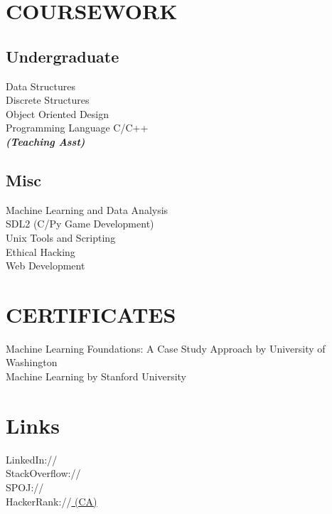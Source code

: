 \documentclass[]{sagar_resume}
\begin{document}
\begin{minipage}[t]{0.33\textwidth}
\section{COURSEWORK}

\subsection{Undergraduate}
Data Structures \\
Discrete Structures \\
Object Oriented Design \\
Programming Language C/C++ \\
{\footnotesize \textit{\textbf{(Teaching Asst) }}} 
\sectionsep

\subsection{Misc}
Machine Learning and Data Analysis\\
SDL2 (C/Py Game Development) \\
Unix Tools and Scripting \\
Ethical Hacking\\
Web Development
\sectionsep


\section{CERTIFICATES}
Machine Learning Foundations: A Case Study Approach by University of Washington \href{https://www.coursera.org/account/accomplishments/records/TQLLDYRT4FFW} {} \\
Machine Learning by Stanford University \href{https://www.coursera.org/account/accomplishments/records/9T9EUFQFX6KH} {} \\
\sectionsep


\section{Links} 
LinkedIn://  \href{https://in.linkedin.com/in/sagarkar10}{} \\
StackOverflow://\href{http://stackoverflow.com/users/4192965/sagar-kar}{}\\
SPOJ:// \href{http://www.spoj.com/users/sagarkar10/}{} \\
HackerRank://\href{https://www.hackerrank.com/sagarkar10}{ (CA)} \\


\end{minipage}
\end{document}
